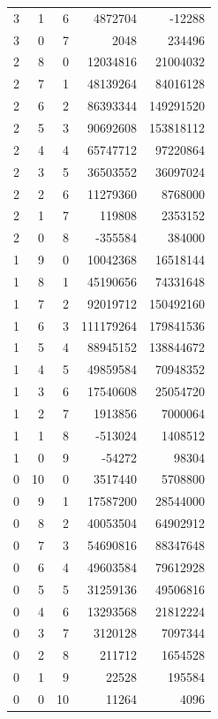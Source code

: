 \begin{longtable}{rrr|rr}
3&1&6&4872704&-12288\\
3&0&7&2048&234496\\
2&8&0&12034816&21004032\\
2&7&1&48139264&84016128\\
2&6&2&86393344&149291520\\
2&5&3&90692608&153818112\\
2&4&4&65747712&97220864\\
2&3&5&36503552&36097024\\
2&2&6&11279360&8768000\\
2&1&7&119808&2353152\\
2&0&8&-355584&384000\\
1&9&0&10042368&16518144\\
1&8&1&45190656&74331648\\
1&7&2&92019712&150492160\\
1&6&3&111179264&179841536\\
1&5&4&88945152&138844672\\
1&4&5&49859584&70948352\\
1&3&6&17540608&25054720\\
1&2&7&1913856&7000064\\
1&1&8&-513024&1408512\\
1&0&9&-54272&98304\\
0&10&0&3517440&5708800\\
0&9&1&17587200&28544000\\
0&8&2&40053504&64902912\\
0&7&3&54690816&88347648\\
0&6&4&49603584&79612928\\
0&5&5&31259136&49506816\\
0&4&6&13293568&21812224\\
0&3&7&3120128&7097344\\
0&2&8&211712&1654528\\
0&1&9&22528&195584\\
0&0&10&11264&4096\\
\end{longtable}

